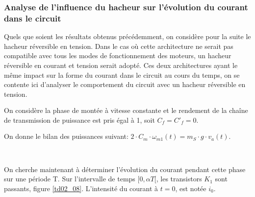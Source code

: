 
\subsubsection{Analyse de l'influence du hacheur sur l'évolution du courant dans le circuit}

Quels que soient les résultats obtenus précédemment, on considère pour la suite le hacheur réversible en tension. Dans le cas où cette architecture ne serait pas compatible avec tous les modes de fonctionnement des moteurs, un hacheur réversible en courant et tension serait adopté. Ces deux architectures ayant le même impact sur la forme du courant dans le circuit au cours du temps, on se contente ici d'analyser le comportement du circuit avec un hacheur réversible en tension.

On considère la phase de montée à vitesse constante et le rendement de la chaîne de transmission de puissance est pris égal à 1, soit $C_f=C'_f=0$.

On donne le bilan des puissances suivant: $2\cdot C_m\cdot\omega_{m1}(t)=m_S\cdot g\cdot v_a(t)$.



~\

On cherche maintenant à déterminer l'évolution du courant pendant cette phase sur une période T. Sur l'intervalle de temps $[0,\alpha T[$, les transistors $K_1$ sont passants, figure \ref{td02_08}. L'intensité du courant à $t = 0$, est notée $i_0$.


